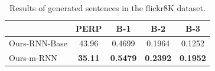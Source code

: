 \begin{table}[h]
	\centering
\begin{tabular}{l|cccc}
\hline
      & PERP  & B-1   & B-2   & B-3 \\
\hline
Ours-RNN-Base & 43.96 & 0.4699 & 0.1964 & 0.1252 \\
Ours-m-RNN & \textbf{35.11} & \textbf{0.5479} & \textbf{0.2392} & \textbf{0.1952} \\
\hline
\end{tabular}%
	\caption{Results of generated sentences in the flickr8K dataset. }
	\label{tab:flickr30K_gen}
\end{table}